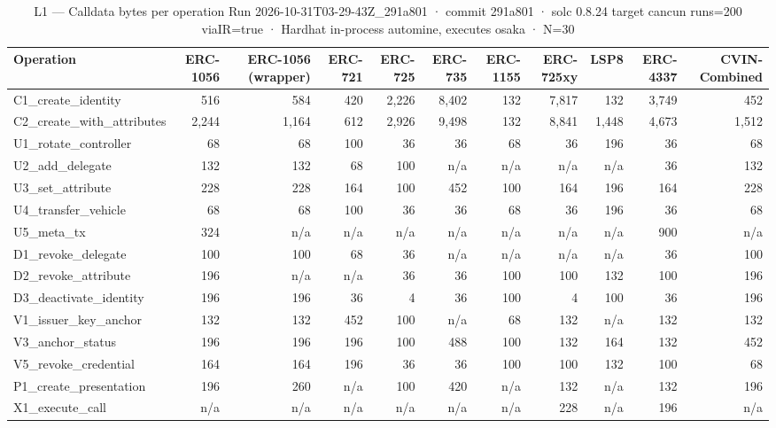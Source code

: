 \begin{table}[ht]
\centering
\small
\begin{tabular}{lrrrrrrrrrr}
\toprule
Operation & ERC-1056 & ERC-1056 (wrapper) & ERC-721 & ERC-725 & ERC-735 & ERC-1155 & ERC-725xy & LSP8 & ERC-4337 & CVIN-Combined \\
\midrule
C1\_create\_identity & 516 & 584 & 420 & 2,226 & 8,402 & 132 & 7,817 & 132 & 3,749 & 452 \\
C2\_create\_with\_attributes & 2,244 & 1,164 & 612 & 2,926 & 9,498 & 132 & 8,841 & 1,448 & 4,673 & 1,512 \\
U1\_rotate\_controller & 68 & 68 & 100 & 36 & 36 & 68 & 36 & 196 & 36 & 68 \\
U2\_add\_delegate & 132 & 132 & 68 & 100 & n/a & n/a & n/a & n/a & 36 & 132 \\
U3\_set\_attribute & 228 & 228 & 164 & 100 & 452 & 100 & 164 & 196 & 164 & 228 \\
U4\_transfer\_vehicle & 68 & 68 & 100 & 36 & 36 & 68 & 36 & 196 & 36 & 68 \\
U5\_meta\_tx & 324 & n/a & n/a & n/a & n/a & n/a & n/a & n/a & 900 & n/a \\
D1\_revoke\_delegate & 100 & 100 & 68 & 36 & n/a & n/a & n/a & n/a & 36 & 100 \\
D2\_revoke\_attribute & 196 & n/a & n/a & 36 & 36 & 100 & 100 & 132 & 100 & 196 \\
D3\_deactivate\_identity & 196 & 196 & 36 & 4 & 36 & 100 & 4 & 100 & 36 & 196 \\
V1\_issuer\_key\_anchor & 132 & 132 & 452 & 100 & n/a & 68 & 132 & n/a & 132 & 132 \\
V3\_anchor\_status & 196 & 196 & 196 & 100 & 488 & 100 & 132 & 164 & 132 & 452 \\
V5\_revoke\_credential & 164 & 164 & 196 & 36 & 36 & 100 & 100 & 132 & 100 & 68 \\
P1\_create\_presentation & 196 & 260 & n/a & 100 & 420 & n/a & 132 & n/a & 132 & 196 \\
X1\_execute\_call & n/a & n/a & n/a & n/a & n/a & n/a & 228 & n/a & 196 & n/a \\
\bottomrule
\end{tabular}
\caption{L1 — Calldata bytes per operation Run 2026-10-31T03-29-43Z\_291a801 · commit 291a801 · solc 0.8.24 target cancun runs=200 viaIR=true · Hardhat in-process automine, executes osaka · N=30}
\label{tab:crud_calldata}
\end{table}
